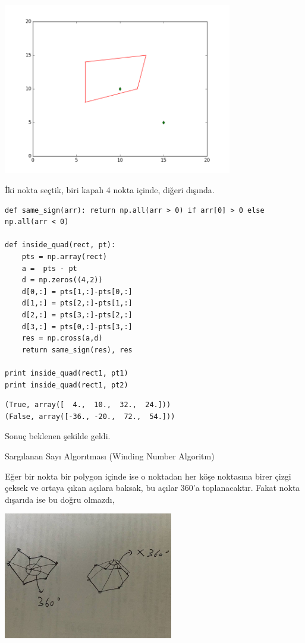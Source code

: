 \documentclass[12pt,fleqn]{article}\usepackage{../../common}
\begin{document}
\includegraphics[width=10cm]{enc_07.png}

İki nokta seçtik, biri kapalı 4 nokta içinde, diğeri dışında. 

\begin{verbatim}
def same_sign(arr): return np.all(arr > 0) if arr[0] > 0 else np.all(arr < 0)

def inside_quad(rect, pt):
    pts = np.array(rect)
    a =  pts - pt
    d = np.zeros((4,2))
    d[0,:] = pts[1,:]-pts[0,:]
    d[1,:] = pts[2,:]-pts[1,:]
    d[2,:] = pts[3,:]-pts[2,:]
    d[3,:] = pts[0,:]-pts[3,:]
    res = np.cross(a,d)
    return same_sign(res), res

print inside_quad(rect1, pt1)
print inside_quad(rect1, pt2)
\end{verbatim}

\begin{verbatim}
(True, array([  4.,  10.,  32.,  24.]))
(False, array([-36., -20.,  72.,  54.]))
\end{verbatim}

Sonuç beklenen şekilde geldi. 

Sargılanan Sayı Algorıtması (Winding Number Algoritm)

Eğer bir nokta bir polygon içinde ise o noktadan her köşe noktasına birer
çizgi çeksek ve ortaya çıkan açılara baksak, bu açılar 360'a toplanacaktır.
Fakat nokta dışarıda ise bu doğru olmazdı, 

\includegraphics[width=20em]{winding.jpg}
\end{document}
